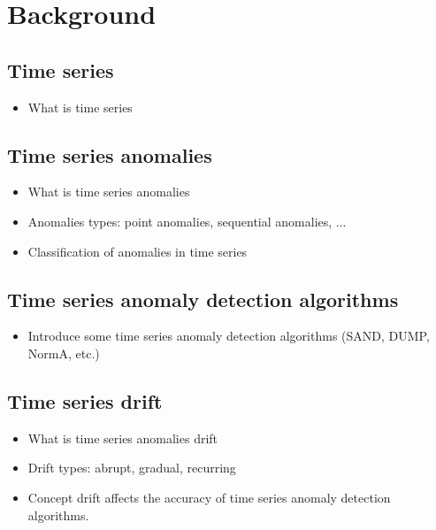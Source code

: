 \chapter{Background}




\section{Time series}
\begin{itemize}
    \item What is time series
\end{itemize}

\section{Time series anomalies}
\begin{itemize}
    \item What is time series anomalies
    \item Anomalies types: point anomalies, sequential anomalies, ...
    \item Classification of anomalies in time series
\end{itemize}

\section{Time series anomaly detection algorithms}
\begin{itemize}
    \item Introduce some time series anomaly detection algorithms (SAND, DUMP, NormA, etc.)
\end{itemize}

\section{Time series drift}
\begin{itemize}
    \item What is time series anomalies drift
    \item Drift types: abrupt, gradual, recurring
    \item Concept drift affects the accuracy of time series anomaly detection algorithms.
\end{itemize}

